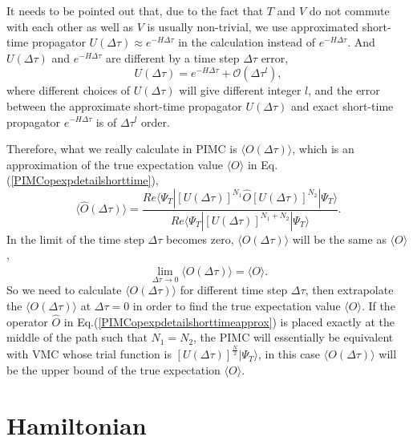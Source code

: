 \documentclass[12pt,letterpaper,UTF8]{report}
\begin{document}
It needs to be pointed out that, due to the fact that $T$ and $V$ do not commute with each other as well as $V$ is usually non-trivial, we use approximated short-time propagator $U(\Delta \tau) \approx e^{-H \Delta \tau}$ in the calculation instead of $e^{-H \Delta \tau}$. And $U(\Delta \tau)$ and $e^{-H \Delta \tau}$ are different by a time step $\Delta \tau$ error,
\begin{equation}
U(\Delta \tau) = e^{-H \Delta \tau} + \mathcal{O}(\Delta \tau^l),
\end{equation}
where different choices of $U(\Delta \tau)$ will give different integer $l$, and the error between the approximate short-time propagator $U(\Delta \tau)$ and exact short-time propagator $e^{-H \Delta \tau}$ is of $\Delta \tau^l$ order.

Therefore, what we really calculate in PIMC is $\langle O(\Delta \tau) \rangle$, which is an approximation of the true expectation value $\langle O \rangle$ in Eq.(\ref{PIMCopexpdetailshorttime}),
\begin{equation}
\langle \hat{O} (\Delta \tau) \rangle
= \frac{ Re  \langle \Psi_T| [U(\Delta \tau)]^{N_1} \hat{O} [U(\Delta \tau)]^{N_2}| \Psi_T \rangle  }
{ Re \langle \Psi_T| [U(\Delta \tau)]^{N_1+N_2} | \Psi_T \rangle} .
\label{PIMCopexpdetailshorttimeapprox}
\end{equation}
In the limit of the time step $\Delta \tau$ becomes zero, $\langle O(\Delta \tau) \rangle$ will be the same as $\langle O \rangle$,
\begin{equation}
\lim_{\Delta \tau \rightarrow 0}\langle \hat{O} (\Delta \tau) \rangle
= \langle O \rangle .
\end{equation}
So we need to calculate $\langle O(\Delta \tau) \rangle$ for different time step $\Delta \tau$, then extrapolate the $\langle O(\Delta \tau) \rangle$ at $\Delta \tau=0$ in order to find the true expectation value $\langle O \rangle$.
If the operator $\hat{O}$ in Eq.(\ref{PIMCopexpdetailshorttimeapprox}) is placed exactly at the middle of the path such that $N_1=N_2$, the PIMC will essentially be equivalent with VMC whose trial function is $[U(\Delta \tau)]^{\frac{N}{2}}| \Psi_T \rangle$, in this case $\langle O(\Delta \tau) \rangle$ will be the upper bound of the true expectation $\langle O \rangle$.







\section{Hamiltonian}
\label{secHamilton}
\end{document}
